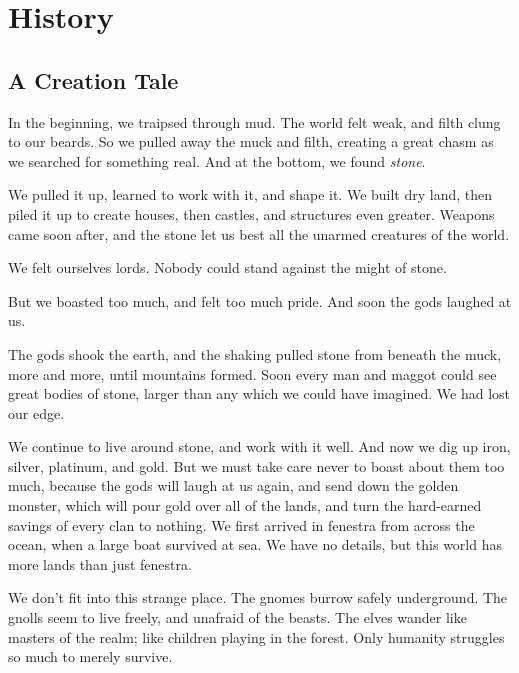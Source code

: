 \section{History}

\begin{multicols}{2}

\subsection{A Creation Tale}

\begin{exampletext}

\ifcase\value{r4}\relax\or
  \noindent
  In the beginning, we traipsed through mud.
  The world felt weak, and filth clung to our beards.
  So we pulled away the muck and filth, creating a great chasm as we searched for something real.
  And at the bottom, we found \emph{stone}.

  We pulled it up, learned to work with it, and shape it.
  We built dry land, then piled it up to create houses, then castles, and structures even greater.
  Weapons came soon after, and the stone let us best all the unarmed creatures of the world.

  We felt ourselves lords.
  Nobody could stand against the might of stone.

  But we boasted too much, and felt too much pride.
  And soon the gods laughed at us.

  The gods shook the earth, and the shaking pulled stone from beneath the muck, more and more, until mountains formed.
  Soon every man and maggot could see great bodies of stone, larger than any which we could have imagined.
  We had lost our edge.

  We continue to live around stone, and work with it well.
  And now we dig up iron, silver, platinum, and gold.
  But we must take care never to boast about them too much, because the gods will laugh at us again, and send down the golden monster, which will pour gold over all of the lands, and turn the hard-earned savings of every clan to nothing.
\or
  We first arrived in \gls{fenestra} from across the ocean, when a large boat survived  at sea.
  We have no details, but this world has more lands than just \gls{fenestra}.

  We don't fit into this strange place.
  The gnomes burrow safely underground.
  The gnolls seem to live freely, and unafraid of the beasts.
  The elves wander like masters of the realm; like children playing in the forest.
  Only humanity struggles so much to merely survive.


\end{exampletext}
\end{multicols}
